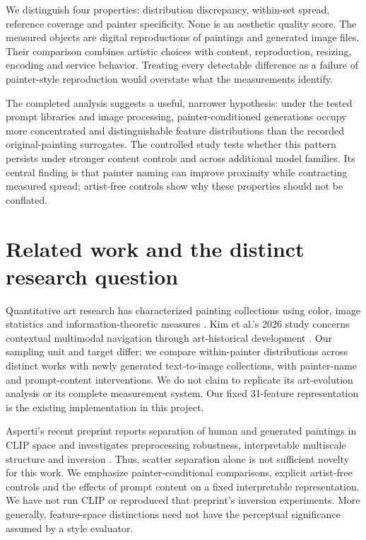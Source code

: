 \documentclass[11pt]{article}
\begin{document}
We distinguish four properties: distribution discrepancy, within-set spread,
reference coverage and painter specificity. None is an aesthetic quality score.
The measured objects are digital reproductions of paintings and generated image
files. Their comparison combines artistic choices with content, reproduction,
resizing, encoding and service behavior. Treating every detectable difference as
a failure of painter-style reproduction would overstate what the measurements identify.

The completed analysis suggests a useful, narrower hypothesis: under the tested
prompt libraries and image processing, painter-conditioned generations occupy
more concentrated and distinguishable feature distributions than the recorded
original-painting surrogates. The controlled study tests whether this pattern persists under stronger content
controls and across additional model families. Its central finding is that painter
naming can improve proximity while contracting measured spread; artist-free
controls show why these properties should not be conflated.

\section{Related work and the distinct research question}
Quantitative art research has characterized painting collections using color,
image statistics and information-theoretic measures
\citep{kim2014,lee2020,sigaki2018}. Kim et al.'s 2026 study concerns contextual
multimodal navigation through art-historical development \citep{kim2026}. Our
sampling unit and target differ: we compare within-painter distributions across
distinct works with newly generated text-to-image collections, with painter-name
and prompt-content interventions. We do not claim to replicate its art-evolution
analysis or its complete measurement system. Our fixed 31-feature representation
is the existing implementation in this project.

Asperti's recent preprint reports separation of human and generated paintings
in CLIP space and investigates preprocessing robustness, interpretable multiscale
structure and inversion \citep{asperti2026}. Thus, scatter separation alone is not
sufficient novelty for this work. We emphasize painter-conditional comparisons,
explicit artist-free controls and the effects of prompt content on a fixed
interpretable representation. We have not run CLIP or reproduced that preprint's
inversion experiments. More generally, feature-space distinctions need not have
the perceptual significance assumed by a style evaluator.
\end{document}
